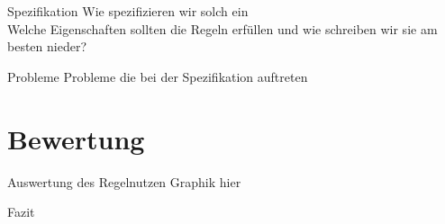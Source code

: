 \documentclass{beamer}
\begin{document}
    \begin{frame}{Spezifikation}
        Wie spezifizieren wir solch ein \sls \\
        Welche Eigenschaften sollten die Regeln erfüllen und wie schreiben wir sie am besten nieder?
    \end{frame}

    \begin{frame}{Probleme}
        Probleme die bei der Spezifikation auftreten
    \end{frame}

    \section{Bewertung}
    \label{sec:bewertung}
    \begin{frame}{Auswertung des Regelnutzen}
        Graphik hier
    \end{frame}

    \begin{frame}{Fazit}

    \end{frame}
\end{document}

